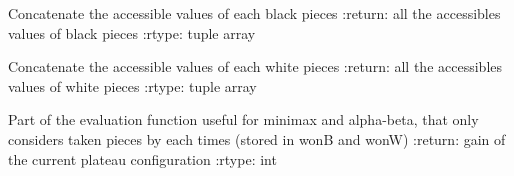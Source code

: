 \documentclass[letterpaper,10pt,french]{sphinxmanual}
\begin{document}

\begin{fulllineitems}
\label{\detokenize{autodoc:echecs.ensemble_valeurs_accessibles_B}}
Concatenate the accessible values of each black pieces
:return: all the accessibles values of black pieces
:rtype: tuple array

\end{fulllineitems}


\begin{fulllineitems}
\label{\detokenize{autodoc:echecs.ensemble_valeurs_accessibles_W}}
Concatenate the accessible values of each white pieces
:return: all the accessibles values of white pieces
:rtype: tuple array

\end{fulllineitems}


\begin{fulllineitems}
\label{\detokenize{autodoc:echecs.eval_denombrement}}
Part of the evaluation function useful for minimax and alpha-beta, that only considers
taken pieces by each times (stored in wonB and wonW)
:return: gain of the current plateau configuration
:rtype: int

\end{fulllineitems}


\begin{fulllineitems}
\label{\detokenize{autodoc:echecs.get_alpha_beta_B}}
\end{fulllineitems}


\begin{fulllineitems}
\label{\detokenize{autodoc:echecs.get_alpha_beta_W}}
\end{fulllineitems}
\end{document}
